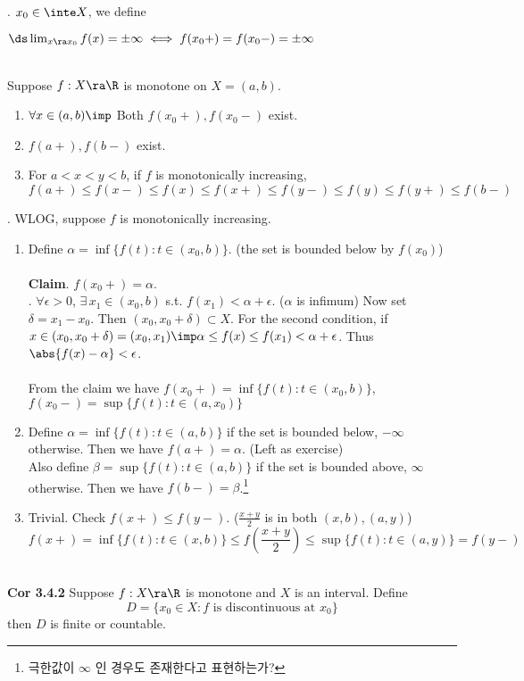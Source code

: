 \rmk. $x_0\in \inte X$, we define
\begin{center}
	$\ds\lim_{x\ra x_0} f(x) = \pm \infty \iff f(x_0+) = f(x_0-) = \pm \infty$
\end{center}~\\
 Suppose $f:X\ra\R$ is monotone on $X = (a, b)$.
\begin{enumerate}
	\item $\forall x\in (a, b) \imp $ Both $f(x_0+), f(x_0-)$ exist.
	\item $f(a+), f(b-)$ exist.
	\item For $a<x<y<b$, if $f$ is monotonically increasing, $$f(a+)\leq f(x-) \leq f(x) \leq f(x+) \leq f(y-) \leq f(y) \leq f(y+)\leq f(b-)$$
\end{enumerate}
\pf. WLOG, suppose $f$ is monotonically increasing.
\begin{enumerate}
	\item Define $\alpha = \inf\{f(t):t\in (x_0, b) \}$. (the set is bounded below by $f(x_0)$)\\
	\\
	\textbf{Claim}. $f(x_0+) = \alpha$.\\
	\pf. $\forall \epsilon > 0$, $\exists\, x_1\in (x_0, b)$ s.t. $f(x_1) < \alpha + \epsilon$. ($\alpha$ is infimum) Now set $\delta = x_1 - x_0$. Then $(x_0, x_0+\delta) \subset X$. For the second condition, if $x\in (x_0, x_0+\delta) = (x_0, x_1) \imp \alpha \leq f(x) \leq f(x_1)< \alpha + \epsilon$. Thus $\abs{f(x) - \alpha} < \epsilon$.\\
	\\
	From the claim we have $f(x_0+) = \inf\{f(t): t\in (x_0, b) \}$, $f(x_0-) = \sup\{f(t): t\in (a, x_0) \}$
	\item Define $\alpha = \inf\{f(t):t\in (a, b) \}$ if the set is bounded below, $-\infty$ otherwise. Then we have $f(a+) = \alpha$. (Left as exercise)\\
	Also define $\beta = \sup\{f(t):t\in (a, b) \}$ if the set is bounded above, $\infty$ otherwise. Then we have $f(b-) = \beta$.\footnote{극한값이 $\infty$ 인 경우도 존재한다고 표현하는가?}
	\item Trivial. Check $f(x+) \leq f(y-)$. ($\frac{x+y}{2}$ is in both $(x, b), (a, y)$)
	$$f(x+) = \inf\{ f(t): t\in (x, b) \} \leq f\left(\frac{x+y}{2}\right) \leq \sup\{f(t):t\in (a, y) \} = f(y-)$$
\end{enumerate}~\\
\textbf{Cor 3.4.2} Suppose $f:X\ra \R$ is monotone and $X$ is an interval. Define $$D=\{x_0\in X: f \text{ is discontinuous at } x_0 \}$$ then $D$ is finite or countable.\\
